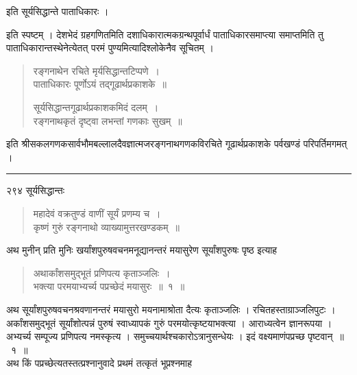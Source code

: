 \documentclass[11pt, openany]{book}
\begin{document}
 \begin{center}
 इति सूर्यसिद्धान्ते पाताधिकारः । 
\end{center}
इति स्पष्टम् । देशभेदं ग्रहगणितमिति दशाधिकारात्मकग्रन्थपूर्वार्धं पाताधिकारसमाप्त्या समाप्तमिति तु पाताधिकारान्तस्थेनेत्येतत् परमं पुण्यमित्यादिश्लोकेनैव सूचितम् । 

 \begin{quote}
{\qt  रङ्गनाथेन रचिते मृर्यसिद्धान्तटिप्पणे~।\\
 पाताधिकारः पूर्णोऽयं तद्गूढार्थप्रकाशके~॥
 
सूर्यसिद्धान्तगूढार्थप्रकाशकमिदं दलम्~।\\
रङ्गनाथकृतं दृष्ट्वा लभन्तां गणकाः सुखम्~॥}
\end{quote}

 इति श्रीसकलगणकसार्वभौमबल्लालदैवज्ञात्मजरङ्गनाथगणकविरचिते गूढार्थप्रकाशके पर्वखण्डं परिपर्तिमगमत् । 



\begin{center}
 \noindent\rule{7em}{.5pt}   
\end{center}


\newpage
\noindent २९४ \hspace{4cm} सूर्यसिद्धान्तः 
\vspace{1cm}


 
\begin{quote}
{\qt महादेवं वक्रतुण्डं वाणीं सूर्यं प्रणम्य च~।\\
 कृष्णं गुरुं रङ्गनाथो व्याख्यामुत्तरखण्डकम्~॥}
\end{quote}

\noindent अथ मुनीन् प्रति मुनिः खर्यांशपुरुषवचनमनूद्यानन्तरं मयासुरेण सूर्यांशपुरुषः पृष्ठ इत्याह \textendash


 \begin{quote}
 {\ssi अथार्कांशसमुद्भूतं प्रणिपत्य कृताञ्जलिः~।\\ 
भक्त्या परमयाभ्यर्च्य पप्रच्छेदं मयासुरः~॥~१~॥ }
\end{quote}

 अथ सूर्यांशपुरुषवचनश्रवणानन्तरं मयासुरो मयनामाश्रोता दैत्यः कृताञ्जलिः । रचितहस्ताग्राञ्जलिपुटः । अर्कांशसमुद्भूतं सूर्यांशोत्पन्नं पुरुषं स्वाध्यापकं गुरुं परमयोत्कृष्टयाभक्त्या । आराध्यत्वेन ज्ञानरूपया । अभ्यर्च्य सम्पूज्य प्रणिपत्य नमस्कृत्य । समुच्चयार्थश्चकारोऽत्रानुसन्धेयः । इदं वक्ष्यमाणंपप्रच्छ पृष्टवान्~॥~१~॥\\
 \noindent अथ किं पप्रच्छेत्यतस्तत्प्रश्नानुवादे प्रथमं तत्कृतं भूप्रश्नमाह\textendash 
 
\end{document}
